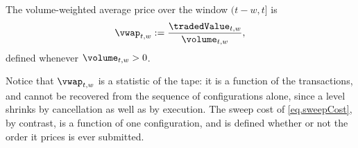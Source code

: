 \begin{defi}
The volume-weighted average price over the window $(t-w,t]$ is
\begin{equation}
\label{eq.vwap}
\vwap_{t,w} := \frac{\tradedValue_{t,w}}{\volume_{t,w}} ,
\end{equation}
defined whenever $\volume_{t,w} > 0$.
\end{defi}

\begin{remark}
Notice that $\vwap_{t,w}$ is a statistic of the tape:
it is a function of the transactions, and cannot be recovered
from the sequence of configurations alone,
since a level shrinks by cancellation as well as by execution.
The sweep cost of \eqref{eq.sweepCost}, by contrast, is a function of one configuration,
and is defined whether or not the order it prices is ever submitted.
\end{remark}
